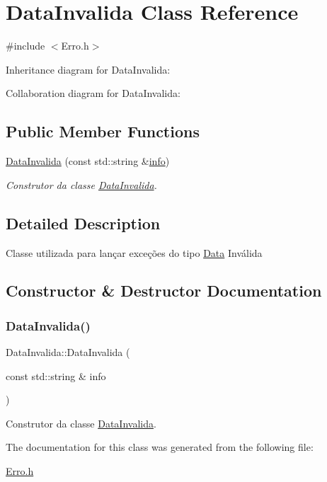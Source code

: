 \hypertarget{class_data_invalida}{}\section{Data\+Invalida Class Reference}
\label{class_data_invalida}


{\ttfamily \#include $<$Erro.\+h$>$}



Inheritance diagram for Data\+Invalida\+:


Collaboration diagram for Data\+Invalida\+:
\subsection*{Public Member Functions}
\begin{DoxyCompactItemize}
\item 
\mbox{\hyperlink{class_data_invalida_af024b53b8f0ba3c388a6283df30d7123}{Data\+Invalida}} (const std\+::string \&\mbox{\hyperlink{class_erro_a3ecaaf6f8e15a0830a648035b456cb62}{info}})
\begin{DoxyCompactList}\small\item\em Construtor da classe \mbox{\hyperlink{class_data_invalida}{Data\+Invalida}}. \end{DoxyCompactList}\end{DoxyCompactItemize}


\subsection{Detailed Description}
Classe utilizada para lançar exceções do tipo \mbox{\hyperlink{class_data}{Data}} Inválida 

\subsection{Constructor \& Destructor Documentation}
\mbox{\label{class_data_invalida_af024b53b8f0ba3c388a6283df30d7123}} 
\subsubsection{\texorpdfstring{Data\+Invalida()}{DataInvalida()}}
{\footnotesize\ttfamily Data\+Invalida\+::\+Data\+Invalida (\begin{DoxyParamCaption}\item[{const std\+::string \&}]{info }\end{DoxyParamCaption})\hspace{0.3cm}{\ttfamily [inline]}}



Construtor da classe \mbox{\hyperlink{class_data_invalida}{Data\+Invalida}}. 



The documentation for this class was generated from the following file\+:\begin{DoxyCompactItemize}
\item 
\mbox{\hyperlink{_erro_8h}{Erro.\+h}}\end{DoxyCompactItemize}
